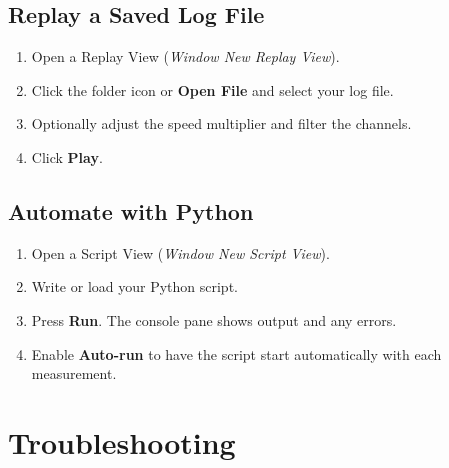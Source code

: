 \documentclass[a4paper,11pt]{article}
\newcommand{\menu}[1]{\textit{#1}}
\newcommand{\ui}[1]{\textbf{#1}}
\begin{document}
\subsection{Replay a Saved Log File}

\begin{enumerate}
  \item Open a Replay View (\menu{Window \textrightarrow{} New \textrightarrow{} Replay View}).
  \item Click the folder icon or \ui{Open File} and select your log file.
  \item Optionally adjust the speed multiplier and filter the channels.
  \item Click \ui{Play}.
\end{enumerate}

\subsection{Automate with Python}

\begin{enumerate}
  \item Open a Script View (\menu{Window \textrightarrow{} New \textrightarrow{} Script View}).
  \item Write or load your Python script.
  \item Press \ui{Run}. The console pane shows output and any errors.
  \item Enable \ui{Auto-run} to have the script start automatically with each
        measurement.
\end{enumerate}

\section{Troubleshooting}
\end{document}
